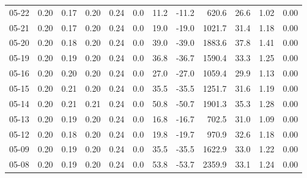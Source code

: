 \begin{threeparttable}
{\begin{tabular}{lrrrrrrrrrrr}
  05-22 &          0.20 &          0.17 &          0.20 &        0.24 &                 0.0 &                11.2 &      -11.2 &               620.6 &             26.6 &            1.02 &                   0.00 \\
  05-21 &          0.20 &          0.17 &          0.20 &        0.24 &                 0.0 &                19.0 &      -19.0 &              1021.7 &             31.4 &            1.18 &                   0.00 \\
  05-20 &          0.20 &          0.18 &          0.20 &        0.24 &                 0.0 &                39.0 &      -39.0 &              1883.6 &             37.8 &            1.41 &                   0.00 \\
  05-19 &          0.20 &          0.19 &          0.20 &        0.24 &                 0.0 &                36.8 &      -36.7 &              1590.4 &             33.3 &            1.25 &                   0.00 \\
  05-16 &          0.20 &          0.20 &          0.20 &        0.24 &                 0.0 &                27.0 &      -27.0 &              1059.4 &             29.9 &            1.13 &                   0.00 \\
  05-15 &          0.20 &          0.21 &          0.20 &        0.24 &                 0.0 &                35.5 &      -35.5 &              1251.7 &             31.6 &            1.19 &                   0.00 \\
  05-14 &          0.20 &          0.21 &          0.21 &        0.24 &                 0.0 &                50.8 &      -50.7 &              1901.3 &             35.3 &            1.28 &                   0.00 \\
  05-13 &          0.20 &          0.19 &          0.20 &        0.24 &                 0.0 &                16.8 &      -16.7 &               702.5 &             31.0 &            1.09 &                   0.00 \\
  05-12 &          0.20 &          0.18 &          0.20 &        0.24 &                 0.0 &                19.8 &      -19.7 &               970.9 &             32.6 &            1.18 &                   0.00 \\
  05-09 &          0.20 &          0.19 &          0.20 &        0.24 &                 0.0 &                35.5 &      -35.5 &              1622.9 &             33.0 &            1.22 &                   0.00 \\
  05-08 &          0.20 &          0.19 &          0.20 &        0.24 &                 0.0 &                53.8 &      -53.7 &              2359.9 &             33.1 &            1.24 &                   0.00 \\

\end{tabular}}
\end{threeparttable}
